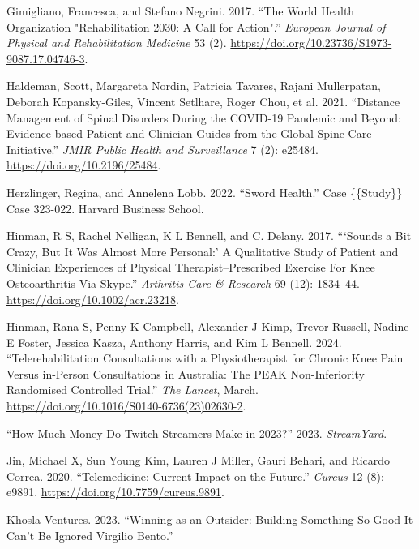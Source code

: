 \documentclass[
  letterpaper,
  DIV=11,
  numbers=noendperiod,
  oneside]{scrartcl}
\newlength{\cslhangindent}
\newenvironment{CSLReferences}[2] %
 {\begin{list}{}{%
  \setlength{\itemindent}{0pt}
  \setlength{\leftmargin}{0pt}
  \setlength{\parsep}{0pt}
  \ifodd #1
   \setlength{\leftmargin}{\cslhangindent}
   \setlength{\itemindent}{-1\cslhangindent}
  \fi
  \setlength{\itemsep}{#2\baselineskip}}}
 {\end{list}}
\begin{document}
\begin{CSLReferences}{1}{0}
Gimigliano, Francesca, and Stefano Negrini. 2017. {``The {World Health
Organization} "{Rehabilitation} 2030: A Call for Action".''}
\emph{European Journal of Physical and Rehabilitation Medicine} 53 (2).
\url{https://doi.org/10.23736/S1973-9087.17.04746-3}.

Haldeman, Scott, Margareta Nordin, Patricia Tavares, Rajani Mullerpatan,
Deborah Kopansky-Giles, Vincent Setlhare, Roger Chou, et al. 2021.
{``Distance Management of Spinal Disorders During the {COVID-19}
Pandemic and Beyond: {Evidence-based} Patient and Clinician Guides from
the Global Spine Care Initiative.''} \emph{JMIR Public Health and
Surveillance} 7 (2): e25484. \url{https://doi.org/10.2196/25484}.

Herzlinger, Regina, and Annelena Lobb. 2022. {``Sword {Health}.''} Case
\{\{Study\}\} Case 323-022. Harvard Business School.

Hinman, R S, Rachel Nelligan, K L Bennell, and C. Delany. 2017.
{``{`{Sounds} a {Bit Crazy}, {But It Was Almost More Personal}:'} {A
Qualitative Study} of {Patient} and {Clinician Experiences} of {Physical
Therapist}--{Prescribed Exercise For Knee Osteoarthritis Via Skype}.''}
\emph{Arthritis Care \& Research} 69 (12): 1834--44.
\url{https://doi.org/10.1002/acr.23218}.

Hinman, Rana S, Penny K Campbell, Alexander J Kimp, Trevor Russell,
Nadine E Foster, Jessica Kasza, Anthony Harris, and Kim L Bennell. 2024.
{``Telerehabilitation Consultations with a Physiotherapist for Chronic
Knee Pain Versus in-Person Consultations in {Australia}: The {PEAK}
Non-Inferiority Randomised Controlled Trial.''} \emph{The Lancet},
March. \url{https://doi.org/10.1016/S0140-6736(23)02630-2}.

{``How {Much Money Do Twitch Streamers Make} in 2023?''} 2023.
\emph{StreamYard}.

Jin, Michael X, Sun Young Kim, Lauren J Miller, Gauri Behari, and
Ricardo Correa. 2020. {``Telemedicine: {Current Impact} on the
{Future}.''} \emph{Cureus} 12 (8): e9891.
\url{https://doi.org/10.7759/cureus.9891}.

Khosla Ventures. 2023. {``Winning as an {Outsider}: {Building Something
So Good It Can}'t {Be Ignored} {\textbar} {Virgilio Bento}.''}


\end{CSLReferences}
\end{document}
